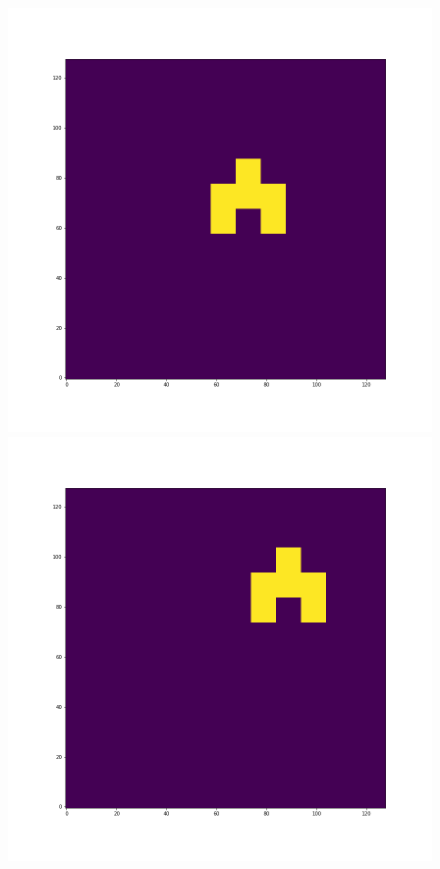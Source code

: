 \documentclass[12pt,a4paper]{article}
\begin{document}
\begin{figure}[H]
\centering
\begin{minipage}{.3\textwidth}
  \centering
  \includegraphics[width=\linewidth]{Pictures/Solve2DWhiteBearMovementTestJR/Solve2DWhiteBearMovementTest_t30.png}
\end{minipage}%
\begin{minipage}{.3\textwidth}
  \centering
  \includegraphics[width=\linewidth]{Pictures/Solve2DWhiteBearMovementTestJR/Solve2DWhiteBearMovementTest_t40.png}

\end{minipage}
\end{figure}
\end{document}
